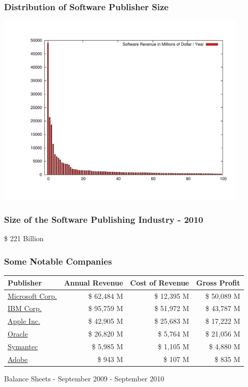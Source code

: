 \documentclass[18pt]{beamer}
\begin{document}
\begin{frame}
\frametitle{Distribution of Software Publisher Size}
  \includegraphics[width=0.9\textwidth,height=0.9\paperheight]{../Art/LargestSoftwarePublishersPlot.pdf}
\end{frame}


\begin{frame}
\frametitle{Size of the Software Publishing Industry - 2010}
\fontsize{72pt}{90pt}\selectfont
\begin{center}
\$ 221 Billion
\end{center}
\end{frame}


\begin{frame}
\frametitle{Some Notable Companies}
\begin{tabular}{lrrr}
\hline
\textbf{Publisher} & \textbf{Annual Revenue} & \textbf{Cost of Revenue} & \textbf{Gross Profit} \\
\hline
\hline
\href{http://www.google.com/finance?fstype=ii\&q=NASDAQ:MSFT}{Microsoft Corp.} & \$ 62,484 M & \$ 12,395 M  & \$ 50,089 M  \\
\hline
\href{http://www.google.com/finance?q=NYSE:IBM\&fstype=ii}{IBM Corp.} & \$ 95,759 M & \$ 51,972 M & \$ 43,787 M \\
\hline
\href{http://www.google.com/finance?q=NASDAQ:AAPL\&fstype=ii}{Apple Inc.} & \$ 42,905 M & \$ 25,683 M & \$ 17,222 M \\
\hline
\href{http://www.google.com/finance?q=NASDAQ:ORCL\&fstype=ii}{Oracle} & \$ 26,820 M & \$ 5,764 M & \$ 21,056 M \\
\hline
\href{http://www.google.com/finance?q=NASDAQ:SYMC\&fstype=ii}{Symantec} & \$ 5,985 M & \$ 1,105 M & \$ 4,880 M \\
\hline
\href{http://www.google.com/finance?q=NASDAQ:ADBE\&fstype=ii}{Adobe} & \$ 943 M & \$ 107 M & \$ 835 M \\
\hline
\end{tabular}
\bigskip
\begin{center}
Balance Sheets - September 2009 - September 2010
\end{center}
\end{frame}
\end{document}
